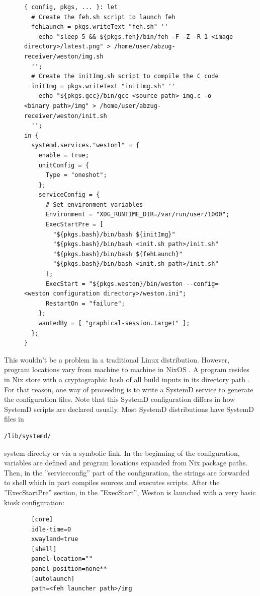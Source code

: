 \begin{figure}[H]
\begin{lstlisting} 
{ config, pkgs, ... }: let
  # Create the feh.sh script to launch feh
  fehLaunch = pkgs.writeText "feh.sh" ''
    echo "sleep 5 && ${pkgs.feh}/bin/feh -F -Z -R 1 <image directory>/latest.png" > /home/user/abzug-receiver/weston/img.sh
  '';
  # Create the initImg.sh script to compile the C code
  initImg = pkgs.writeText "initImg.sh" ''
    echo "${pkgs.gcc}/bin/gcc <source path> img.c -o <binary path>/img" > /home/user/abzug-receiver/weston/init.sh
  '';
in {
  systemd.services."westonl" = {
    enable = true;
    unitConfig = {
      Type = "oneshot";
    };
    serviceConfig = {
      # Set environment variables
      Environment = "XDG_RUNTIME_DIR=/var/run/user/1000";
      ExecStartPre = [
        "${pkgs.bash}/bin/bash ${initImg}"
        "${pkgs.bash}/bin/bash <init.sh path>/init.sh"
        "${pkgs.bash}/bin/bash ${fehLaunch}"
        "${pkgs.bash}/bin/bash <init.sh path>/init.sh"
      ];
      ExecStart = "${pkgs.weston}/bin/weston --config=<weston configuration directory>/weston.ini";
      RestartOn = "failure";
    };
    wantedBy = [ "graphical-session.target" ];
  };
}
\end{lstlisting}
\label{systemd1}
\end{figure}

This wouldn't be a problem in a traditional Linux distribution. However, program locations vary from machine to machine in NixOS \cite{dolstra2010nixos}. A program resides in Nix store with a
cryptographic hash of all build inputs in its directory
path \cite{dolstra2010nixos}. For that reason, one way of proceeding
is to write a SystemD service to generate the configuration
files. Note that this SystemD configuration differs in how SystemD
scripts are declared usually. Most SystemD distributions have SystemD
files in
\begin{lstlisting}
/lib/systemd/
\end{lstlisting}
system directly or via a symbolic link. In the beginning of the configuration, variables are defined and
program locations expanded from Nix package paths. Then, in the
''serviceconfig'' part of the configuration, the strings are forwarded
to shell which in part compiles sources and executes scripts. After
the ''ExecStartPre'' section, in the ''ExecStart'', Weston is launched
with a very basic kiosk configuration:

\begin{figure}[H]
\begin{lstlisting} 
  [core]
  idle-time=0
  xwayland=true
  [shell]
  panel-location=""
  panel-position=none**
  [autolaunch]
  path=<feh launcher path>/img
\end{lstlisting}
\label{westonconf}
\end{figure}

